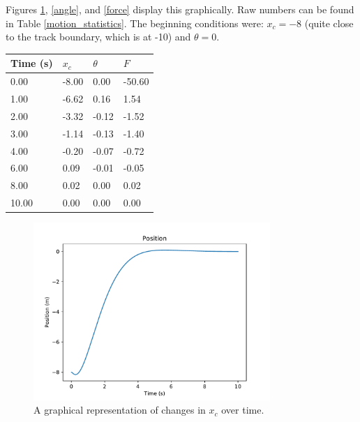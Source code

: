\documentclass[12pt]{article}
\begin{document}
Figures \ref{position}, \ref{angle}, and \ref{force} display this graphically. Raw numbers can be found in Table \ref{motion_statistics}. The beginning conditions were: $x _c = -8$ (quite close to the track boundary, which is at -10) and $\theta = 0$.

\begin{center}
    \begin{tabular}{|l|l|l|l|}
        \hline
        Time (s) & $x _c$ & $\theta$ & $F$ \\
        \hline
        0.00 & -8.00 & 0.00 & -50.60 \\
        \hline
        1.00 & -6.62 & 0.16 & 1.54 \\
        \hline
        2.00 & -3.32 & -0.12 & -1.52 \\
        \hline
        3.00 & -1.14 & -0.13 & -1.40 \\
        \hline
        4.00 & -0.20 & -0.07 & -0.72 \\
        \hline
        6.00 & 0.09 & -0.01 & -0.05 \\
        \hline
        8.00 & 0.02 & 0.00 & 0.02 \\
        \hline
        10.00 & 0.00 & 0.00 & 0.00 \\
        \hline
    \end{tabular}
     \label{motion_statistics}
\end{center}

\begin{figure}[ht]
    \centering
    \includegraphics[width=0.8\textwidth]{position}
    \caption{\label{position} A graphical representation of changes in $x _c$ over time.}
\end{figure}
\end{document}
